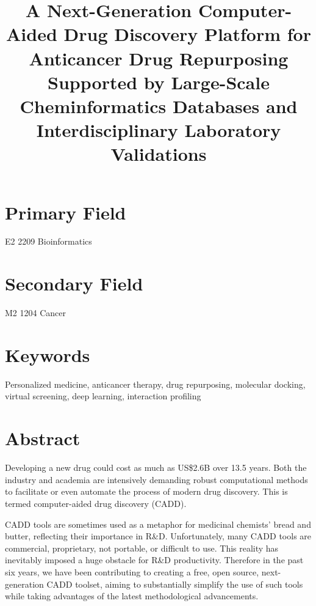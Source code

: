 \documentclass[a4paper,12pt]{article}
\begin{document}
\title{A Next-­Generation Computer­-Aided Drug Discovery Platform for Anticancer Drug Repurposing Supported by Large-­Scale Cheminformatics Databases and Interdisciplinary Laboratory Validations}
\maketitle

\section*{Primary Field}

E2 2209 Bioinformatics

\section*{Secondary Field}

M2 1204 Cancer

\section*{Keywords}

Personalized medicine, anticancer therapy, drug repurposing, molecular docking, virtual screening, deep learning, interaction profiling

\section*{Abstract}

Developing a new drug could cost as much as US\$2.6B over 13.5 years. Both the industry and academia are intensively demanding robust computational methods to facilitate or even automate the process of modern drug discovery. This is termed computer-aided drug discovery (CADD).

CADD tools are sometimes used as a metaphor for medicinal chemists' bread and butter, reflecting their importance in R\&D. Unfortunately, many CADD tools are commercial, proprietary, not portable, or difficult to use. This reality has inevitably imposed a huge obstacle for R\&D productivity. Therefore in the past six years, we have been contributing to creating a free, open source, next-generation CADD toolset, aiming to substantially simplify the use of such tools while taking advantages of the latest methodological advancements.
\end{document}
